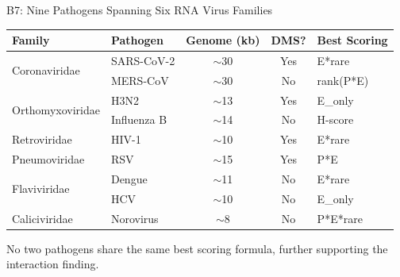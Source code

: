 \documentclass[aspectratio=169,11pt]{beamer}
\begin{document}
\begin{frame}{B7: Nine Pathogens Spanning Six RNA Virus Families}

\begin{center}
\small
\begin{tabular}{llccl}
\toprule
\textbf{Family} & \textbf{Pathogen} & \textbf{Genome (kb)} & \textbf{DMS?} & \textbf{Best Scoring} \\
\midrule
\multirow{2}{*}{Coronaviridae} & SARS-CoV-2 & $\sim$30 & Yes & E*rare \\
 & MERS-CoV & $\sim$30 & No & rank(P*E) \\
\multirow{2}{*}{Orthomyxoviridae} & H3N2 & $\sim$13 & Yes & E\_only \\
 & Influenza B & $\sim$14 & No & H-score \\
Retroviridae & HIV-1 & $\sim$10 & Yes & E*rare \\
Pneumoviridae & RSV & $\sim$15 & Yes & P*E \\
\multirow{2}{*}{Flaviviridae} & Dengue & $\sim$11 & No & E*rare \\
 & HCV & $\sim$10 & No & E\_only \\
Caliciviridae & Norovirus & $\sim$8 & No & P*E*rare \\
\bottomrule
\end{tabular}
\end{center}

\vspace{0.5em}
No two pathogens share the same best scoring formula, further supporting the interaction finding.
\end{frame}
\end{document}
